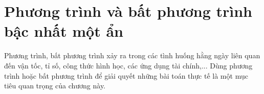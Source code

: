 \chapter{Phương trình và bất phương trình bậc nhất một ẩn}

Phương trình, bất phương trình xảy ra trong các tình huống hằng ngày liên quan đến vận tốc, tỉ số, công thức hình học, các ứng dụng tài chính,... Dùng phương trình hoặc bất phương trình để giải quyết những bài toán thực tế là một mục tiêu quan trọng của chương này.






